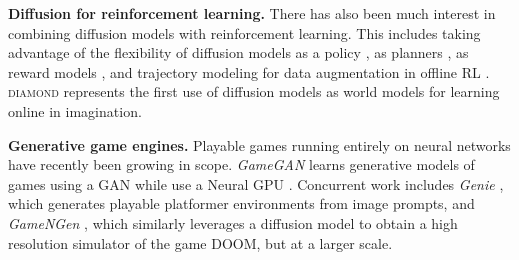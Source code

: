 \textbf{Diffusion for reinforcement learning.} There has also been much interest in combining diffusion models with reinforcement learning. This includes taking advantage of the flexibility of diffusion models as a policy \citep{wang2022diffusion, ajay2022conditional,pearce2023imitating}, as planners \citep{janner2022planning, liang2023adaptdiffuser}, as reward models \citep{nuti2023extracting}, and trajectory modeling for data augmentation in offline RL \citep{lu2023synthetic,ding2024diffusion,jackson2024policyguided}. \textsc{diamond} represents the first use of diffusion models as world models for learning online in imagination. 

\textbf{Generative game engines.} Playable games running entirely on neural networks have recently been growing in scope. \textit{GameGAN} \citep{gameGAN2020} learns generative models of games using a GAN \citep{goodfellow2014GAN} while \citet{bamford2020neural} use a Neural GPU \citep{kaiser2015neural}. Concurrent work includes \textit{Genie} \citep{bruce2024genie}, which generates playable platformer environments from image prompts, and \textit{GameNGen} \citep{valevski2024diffusionmodelsrealtimegame}, which similarly leverages a diffusion model to obtain a high resolution simulator of the game DOOM, but at a larger scale.